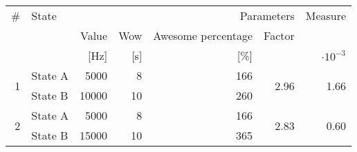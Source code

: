 \begin{table}[!ht]
    \centering
    \footnotesize
    
    \begin{tabular}{r l r r r r r}
        \toprule
        \multicolumn{1}{V{1em}}{\#} &
        \multicolumn{1}{V{4.5em}}{State} &
        \multicolumn{4}{N}{Parameters} &
        \multicolumn{1}{V{3.5em}}{Measure} \\
        
        \cmidrule(lr){3-6}
        
        & & \multicolumn{1}{V{4.5em}}{Value} & \multicolumn{1}{V{4.5em}}{Wow} & \multicolumn{1}{V{4.5em}}{Awesome percentage} & \multicolumn{1}{V{4.5em}}{Factor}  \\
        & & \multicolumn{1}{N}{[Hz]} & \multicolumn{1}{N}{[s]} & \multicolumn{1}{N}{[\%]} & & \multicolumn{1}{N}{$\cdot 10^{-3}$}\\
        
        \cmidrule(r){1-1}\cmidrule(lr){2-2}\cmidrule(lr){3-3}\cmidrule(lr){4-4}\cmidrule(lr){5-5}\cmidrule(lr){6-6}\cmidrule(l){7-7}
        
        \multirow{2}{*}{1} & State A  & 5000  & 8  & 166 & \multirow{2}{*}{2.96} &  \multirow{2}{*}{1.66}\\
                           & State B  & 10000 & 10 & 260 &                       & \\
                           
        \cmidrule(r){1-1}\cmidrule(lr){2-2}\cmidrule(lr){3-3}\cmidrule(lr){4-4}\cmidrule(lr){5-5}\cmidrule(lr){6-6}\cmidrule(l){7-7}
        
        \multirow{2}{*}{2} & State A   & 5000  & 8  & 166 & \multirow{2}{*}{2.83} & \multirow{2}{*}{0.60}\\
                           & State B & 15000 & 10 & 365 &                         & \\
        \bottomrule
    \end{tabular}
\end{table}